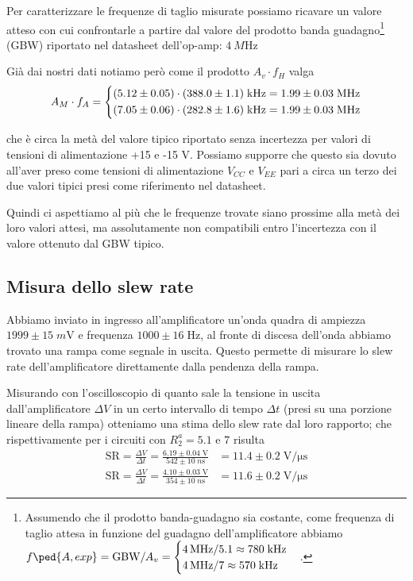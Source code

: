 \documentclass[10pt, a4paper, italian]{article}
\begin{document}
Per caratterizzare le frequenze di taglio misurate possiamo ricavare un valore
atteso con cui confrontarle a partire dal valore del prodotto banda
guadagno\footnote{Assumendo che il prodotto banda-guadagno sia costante,
come frequenza di taglio attesa in funzione del guadagno dell'amplificatore
abbiamo
$f\ped{A, exp} = \mathrm{GBW}/A_v =
\begin{cases}
\SI{4}{M\Hz} / 5.1 \approx 780 \; \si{k\Hz} \\
\SI{4}{M\Hz} / 7 \approx 570 \; \si{k\Hz}
\end{cases}$.}
(GBW) riportato nel datasheet dell'op-amp: $\SI{4}{M\Hz}$

Già dai nostri dati notiamo però come il prodotto $A_v \cdot f_H$ valga
\[
A_M \cdot f_A = 
\begin{dcases}
(5.12 \pm 0.05) \cdot (388.0 \pm 1.1) \; \si{k\Hz} =
1.99 \pm 0.03 \; \si{M\Hz} \\
%
(7.05 \pm 0.06) \cdot (282.8 \pm 1.6) \; \si{k\Hz} =
1.99 \pm 0.03 \; \si{M\Hz} \\
\end{dcases}
\]

che è circa la metà del valore tipico riportato senza incertezza per valori
di tensioni di alimentazione +15 e -15 V. Possiamo supporre che questo sia
dovuto all'aver preso come tensioni di alimentazione $V_{CC}$ e $V_{EE}$
pari a circa un terzo dei due valori tipici presi come riferimento nel
datasheet.

Quindi ci aspettiamo al più che le frequenze trovate siano prossime alla
metà dei loro valori attesi, ma assolutamente non compatibili entro
l'incertezza con il valore ottenuto dal GBW tipico.

\subsection{Misura dello slew rate}
Abbiamo inviato in ingresso all'amplificatore un'onda quadra di ampiezza
$1999 \pm 15 \; \si{m\V}$ e frequenza $1000 \pm 16 \; \si{\Hz}$, al fronte di
discesa dell'onda abbiamo trovato una rampa come segnale in uscita. Questo
permette di misurare lo slew rate dell'amplificatore direttamente dalla
pendenza della rampa.

Misurando con l'oscilloscopio di quanto sale la tensione in uscita
dall'amplificatore $\Delta V$ in un certo intervallo di tempo $\Delta t$
(presi su una porzione lineare della rampa) otteniamo una stima dello slew
rate dal loro rapporto; che rispettivamente per i circuiti con $R_2^a = 5.1$
e $7$ risulta
\begin{align*}
\mathrm{SR} = \frac{\Delta V}{\Delta t} =
\frac{6.19 \pm 0.04 \; \si{\V}}{542 \pm 10 \; \si{n\s}}
&= 11.4 \pm 0.2 \; \si{\V/\micro\s} \\
\mathrm{SR} = \frac{\Delta V}{\Delta t} =
\frac{4.10 \pm 0.03 \; \si{\V}}{354 \pm 10 \; \si{n\s}}
&= 11.6 \pm 0.2 \; \si{\V/\micro\s}  
\end{align*}
\end{document}
